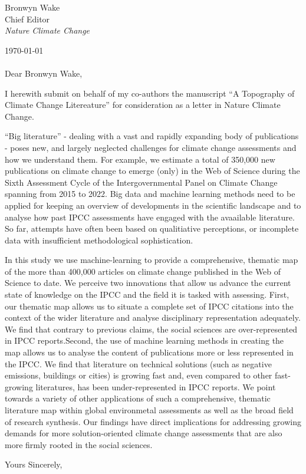 \documentclass{letter}
\begin{document}
\begin{letter}{Bronwyn Wake \\ Chief Editor \\ \textit{Nature Climate Change}}
		\date{}
		
		


   \opening{\today \\ \\ Dear Bronwyn Wake,}

   I herewith submit on behalf of my co-authors the manuscript ``A Topography of Climate Change Litereature'' for consideration as a letter in Nature Climate Change.

``Big literature'' - dealing with a vast and rapidly expanding body of publications - poses new, and largely neglected challenges for climate change assessments and how we understand them. For example, we estimate a total of 350,000 new publications on climate change to emerge (only) in the Web of Science during the Sixth Assessment Cycle of the Intergovernmental Panel on Climate Change spanning from 2015 to 2022. Big data and machine learning methods need to be applied for keeping an overview of developments in the scientific landscape and to analyse how past IPCC assessments have engaged with the avaailable literature. So far, attempts \cite{Bjurström2011, Hulme2010, Victor2015, Corbera2016, Kowarsch2017} have often been based on qualitiative perceptions, or incomplete data with insufficient methodological sophistication.

In this study we use machine-learning to provide a comprehensive, thematic map of the more than 400,000 articles on climate change published in the Web of Science to date. We perceive two innovations that allow us advance the current state of knowledge on the IPCC and the field it is tasked with assessing. First, our thematic map allows us to situate a complete set of IPCC citations into the context of the wider literature and analyse disciplinary representation adequately.  We find that contrary to previous claims, the social sciences are over-represented in IPCC reports.Second, the use of machine learning methods in creating the map allows us to analyse the content of publications more or less represented in the IPCC. We find that literature on technical solutions (such as negative emissions, buildings or cities) is growing fast and, even compared to other fast-growing literatures, has been under-represented in IPCC reports. We point towards a variety of other applications of such a comprehensive, thematic literature map within global environmetal assessments as well as the broad field of research synthesis. Our findings have direct implications for addressing growing demands for more solution-oriented climate change assessments that are also more firmly rooted in the social sciences.

\closing{Yours Sincerely,}





\end{letter}
\end{document}
